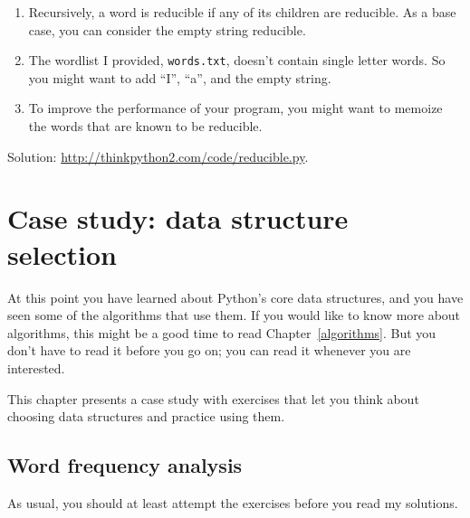 \documentclass[10pt]{book}
\begin{document}
\begin{exercise}
\begin{enumerate}
\item Recursively, a word is reducible if any of its children
are reducible.  As a base case, you can consider the empty
string reducible.

\item The wordlist I provided, {\tt words.txt}, doesn't
contain single letter words.  So you might want to add
``I'', ``a'', and the empty string.

\item To improve the performance of your program, you might want
to memoize the words that are known to be reducible.

\end{enumerate}

Solution: \url{http://thinkpython2.com/code/reducible.py}.

\end{exercise}








\chapter{Case study: data structure selection}

At this point you have learned about Python's core data structures,
and you have seen some of the algorithms that use them.
If you would like to know more about algorithms, this might be a good
time to read Chapter~\ref{algorithms}.
But you don't have to read it before you go on; you can read
it whenever you are interested.

This chapter presents a case study with exercises that let
you think about choosing data structures and practice using them.


\section{Word frequency analysis}
\label{analysis}

As usual, you should at least attempt the exercises
before you read my solutions.
\end{document}
